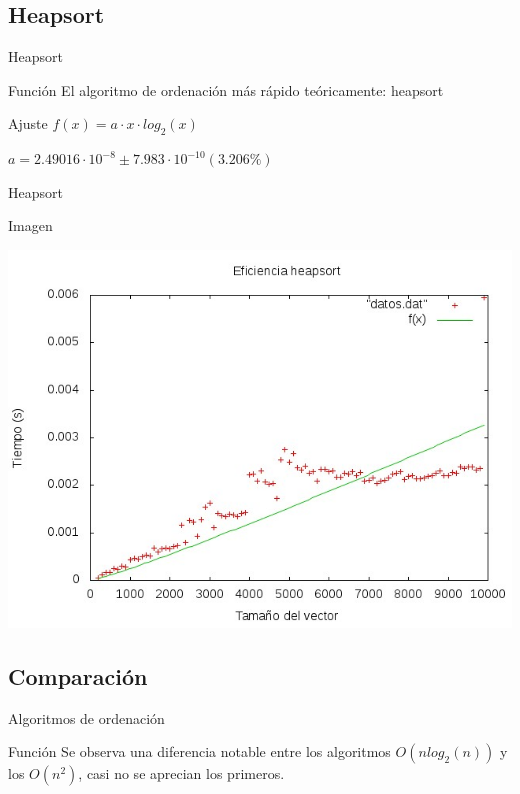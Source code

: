 \documentclass[compress]{beamer}
\begin{document}
\subsection{Heapsort}
\begin{frame}{Heapsort}
	\begin{block}{Función}
	El algoritmo de ordenación más rápido teóricamente: heapsort
	\end{block}
	
	\begin{block}{Ajuste}
	$ f(x) = a\cdot x\cdot log_2(x) $

	$a               = 2.49016\cdot 10^{-8}      \pm 7.983\cdot 10^{-10}    (3.206\%)$	
	\end{block}
\end{frame}
\begin{frame}{Heapsort}
	\begin{alertblock}{Imagen}
	\begin{center}
	\includegraphics[scale=0.55]{../Graficas/Heapsort/heapsortO0_ruben.jpeg}
	\end{center}	
	\end{alertblock}
\end{frame}


\subsection{Comparación}
\begin{frame}{Algoritmos de ordenación}
	\begin{block}{Función}
	Se observa una diferencia notable entre los algoritmos $O(nlog_2(n))$ y los
	$O(n^2)$, casi no se aprecian los primeros.
	\end{block}
\end{frame}
\end{document}
